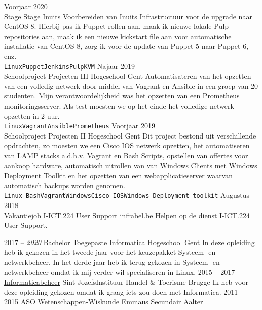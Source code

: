 \documentclass[9pt]{developercv} %
\begin{document}
\begin{entrylist}
	\entry
		{Voorjaar 2020\\\footnotesize{Stage}}
		{Stage}
		{Inuits}
		{Voorbereiden van Inuits Infrastructuur voor de upgrade naar CentOS 8. Hierbij pas ik Puppet rollen aan, maak ik nieuwe lokale Pulp repositories aan, maak ik een nieuwe kickstart file aan voor automatische installatie van CentOS 8, zorg ik voor de update van Puppet 5 naar Puppet 6, enz.
    \\ \texttt{Linux}\slashsep\texttt{Puppet}\slashsep\texttt{Jenkins}\slashsep\texttt{Pulp}\slashsep\texttt{KVM}}
	\entry
		{Najaar 2019\\\footnotesize{Schoolproject}}
		{Projecten III}
		{Hogeschool Gent}
		{Automatisateren van het opzetten van een volledig netwerk door middel van Vagrant en Ansible in een groep van 20 studenten. Mijn verantwoordelijkheid was het opzetten van een Prometheus monitoringsserver. Als test moesten we op het einde het volledige netwerk opzetten in 2 uur.
		\\ \texttt{Linux}\slashsep\texttt{Vagrant}\slashsep\texttt{Ansible}\slashsep\texttt{Prometheus}}
	\entry
		{Voorjaar 2019\\\footnotesize{Schoolproject}}
		{Projecten II}
		{Hogeschool Gent}
		{Dit project bestond uit verschillende opdrachten, zo moesten we een Cisco IOS netwerk opzetten, het automatiseren van LAMP stacks a.d.h.v. Vagrant en Bash Scripts, opstellen van offertes voor aankoop hardware, automatisch uitrollen van van Windows Clients met Windows Deployment Toolkit en het opzetten van een webapplicatieserver waarvan automatisch backups worden genomen.
		\\ \texttt{Linux Bash}\slashsep\texttt{Vagrant}\slashsep\texttt{Windows}\slashsep\texttt{Cisco IOS}\slashsep\texttt{Windows Deployment toolkit}}
	\entry
	    {Augustus 2018\\\footnotesize{Vakantiejob}}
	    {I-ICT.224 User Support}
	    {\href{https://www.infrabel.be/}{infrabel.be}}
	    {Helpen op de dienst I-ICT.224 User Support.}
\end{entrylist}



\begin{entrylist}
	\entry
		{2017 -- \textit{2020}}
		{\href{https://www.hogent.be/opleidingen/bachelors/toegepaste-informatica/}{Bachelor Toegepaste Informatica}}
		{Hogeschool Gent}
		{In deze opleiding heb ik gekozen in het tweede jaar voor het keuzepakket Systeem- en netwerkbeheer. In het derde jaar heb ik terug gekozen in Systeem- en netwerkbeheer omdat ik mij verder wil specialiseren in Linux. }
	\entry
		{2015 -- 2017}
		{\href{https://www.sintjozefbrugge.be/5e-en-6e-netwerken-en-it/}{Informaticabeheer}}
		{Sint-JozefsInstituur Handel \& Toerisme Brugge}
		{Ik heb voor deze opleiding gekozen omdat ik graag iets zou doen met Informatica.}
	\entry
		{2011 -- 2015}
		{ASO Wetenschappen-Wiskunde}
		{Emmaus Secundair Aalter}
		{ }
\end{entrylist}
\end{document}
